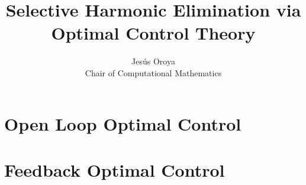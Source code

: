 \documentclass[a4paper]{book}
\title{Selective Harmonic Elimination via Optimal Control Theory}
\author{Jesús Oroya \\ Chair of Computational Mathematics}
\begin{document}
\maketitle

\tableofcontents
\newpage



\chapter{Open Loop Optimal Control}



\chapter{Feedback Optimal Control}


\appendix



 


\end{document}

